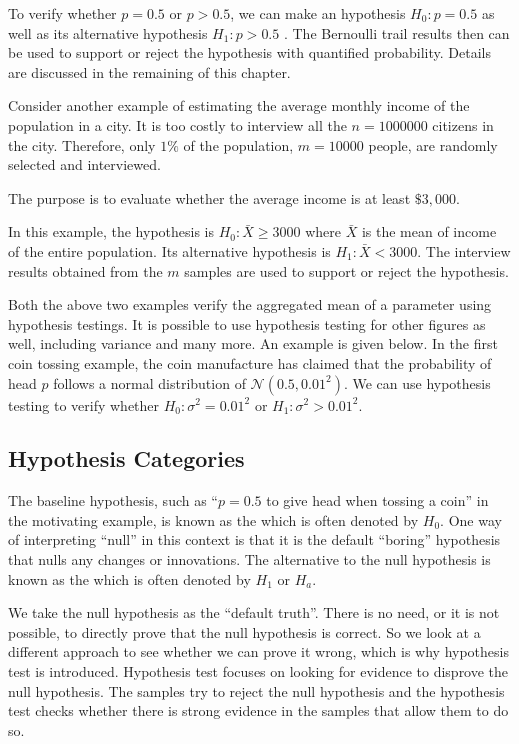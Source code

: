 To verify whether $p=0.5$ or $p>0.5$, we can make an hypothesis $H_0:p=0.5$ as well as its alternative hypothesis $H_1:p>0.5$ . The Bernoulli trail results then can be used to support or reject the hypothesis with quantified probability. Details are discussed in the remaining of this chapter. 

\begin{shortbox}

Consider another example of estimating the average monthly income of the population in a city. It is too costly to interview all the $n=1000000$ citizens in the city. Therefore, only $1\%$ of the population, $m=10000$ people, are randomly selected and interviewed.

The purpose is to evaluate whether the average income is at least $\$3,000$. 

\end{shortbox}

In this example, the hypothesis is $H_0: \bar{X} \geq 3000$ where $\bar{X}$ is the mean of income of the entire population. Its alternative hypothesis is $H_1: \bar{X}<3000$. The interview results obtained from the $m$ samples are used to support or reject the hypothesis.

Both the above two examples verify the aggregated mean of a parameter using hypothesis testings. It is possible to use hypothesis testing for other figures as well, including variance and many more. An example is given below. In the first coin tossing example, the coin manufacture has claimed that the probability of head $p$ follows a normal distribution of $\mathcal{N}(0.5,0.01^2)$. We can use hypothesis testing to verify whether $H_0:\sigma^2=0.01^2$ or $H_1:\sigma^2>0.01^2$.

\subsection{Hypothesis Categories}

The baseline hypothesis, such as ``$p=0.5$ to give head when tossing a coin'' in the motivating example, is known as the  which is often denoted by $H_0$. One way of interpreting ``null'' in this context is that it is the default ``boring'' hypothesis that nulls any changes or innovations. The alternative to the null hypothesis is known as the  which is often denoted by $H_1$ or $H_a$.

We take the null hypothesis as the ``default truth''. There is no need, or it is not possible, to directly prove that the null hypothesis is correct. So we look at a different approach to see whether we can prove it wrong, which is why hypothesis test is introduced. Hypothesis test focuses on looking for evidence to disprove the null hypothesis. The samples try to reject the null hypothesis and the hypothesis test checks whether there is strong evidence in the samples that allow them to do so.

